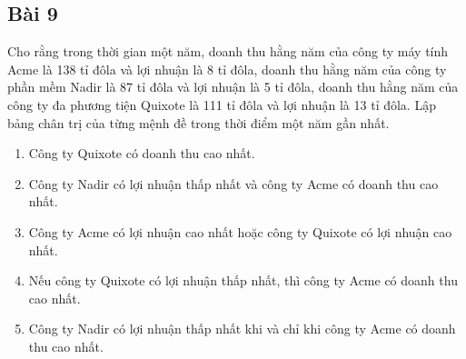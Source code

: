 \subsection*{Bài 9}
Cho rằng trong thời gian một năm, doanh thu hằng năm của công ty máy tính Acme là 138 tỉ đôla và lợi nhuận là 8 tỉ đôla, doanh thu hằng năm của công ty phần mềm Nadir là 87 tỉ đôla và lợi nhuận là 5 tỉ đôla, doanh thu hằng năm của công ty đa phương tiện Quixote là 111 tỉ đôla và lợi nhuận là 13 tỉ đôla. Lập bảng chân trị của từng mệnh đề trong thời điểm một năm gần nhất.
\begin{enumerate}[label=\alph*)]
    \item Công ty Quixote có doanh thu cao nhất.
    \item Công ty Nadir có lợi nhuận thấp nhất và công ty Acme có doanh thu cao nhất.
    \item Công ty Acme có lợi nhuận cao nhất hoặc công ty Quixote có lợi nhuận cao nhất.
    \item Nếu công ty Quixote có lợi nhuận thấp nhất, thì công ty Acme có doanh thu cao nhất.
    \item Công ty Nadir có lợi nhuận thấp nhất khi và chỉ khi công ty Acme có doanh thu cao nhất.
\end{enumerate}
